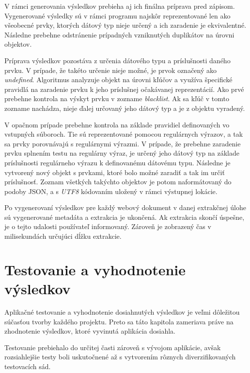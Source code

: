 V rámci generovania výsledkov prebieha aj ich finálna príprava pred zápisom. Vygenerované výsledky sú v rámci programu najskôr reprezentované len ako všeobecné prvky, ktorých dátový typ nieje určený a ich zaradenie je ekvivalentné. Následne prebehne odstránenie prípadných vzniknutých duplikátov na úrovni objektov. 

Príprava výsledkov pozostáva z určenia dátového typu a príslušnosti daného prvku. V prípade, že takéto určenie nieje možné, je prvok označený ako \textit{undefined}. Algoritmus analyzuje objekt na úrovni kľúčov a využíva špecifické pravidlá na zaradenie prvku k jeho príslušnej očakávanej reprezentácií. Ako prvé prebehne kontrola na výskyt prvku v zozname \textit{blacklist}. Ak sa kľúč v tomto zozname nachádza, nieje ďalej určovaný jeho dátový typ a je z objektu vyradený. 

V opačnom prípade prebehne kontrola na základe pravidiel definovaných vo vstupných súboroch. Tie sú reprezentované pomocou regulárnych výrazov, a tak sa prvky porovnávajú s regulárnymi výrazmi. V prípade, že prebehne zaradenie prvku splnením testu na regulárny výraz, je určený jeho dátový typ na základe príslušnosti regulárneho výrazu k definovanému dátovému typu. Následne je vytvorený nový objekt s prvkami, ktoré bolo možné zaradiť a tak im určiť príslušnosť. Zoznam všetkých takýchto objektov je potom naformátovaný do podoby JSON, a s \textit{UTF8} kódovaním uložený v rámci výstupnej lokácie. 

\bigskip

Po vygenerovaní výsledkov pre každý webový dokument v danej extrakčnej úlohe sú vygenerované metadáta a extrakcia je ukončená. Ak extrakcia skončí úspešne, je o tejto udalosti používateľ informovaný. Zároveň je zobrazený čas v milisekundách určujúci dĺžku extrakcie.

\chapter{Testovanie a vyhodnotenie výsledkov}
\label{testing}

Aplikačné testovanie a vyhodnotenie dosiahnutých výsledkov je veľmi dôležitou súčasťou tvorby každého projektu. Preto sa táto kapitola zameriava práve na zhodnotenie výsledkov, ktoré vyvinutá aplikácia dosiahla. 

Testovanie prebiehalo do určitej časti zároveň s vývojom aplikácie, avšak rozsiahlejšie testy boli uskutočnené až s vytvorením rôznych diverzifikovaných testovacích sád.

